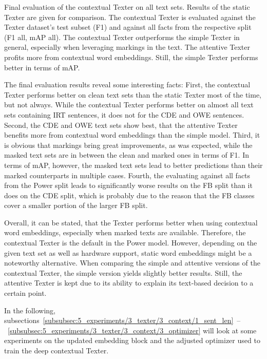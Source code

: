 \begin{table}
    \centering
    
    \caption{Final evaluation of the contextual Texter on all text sets. Results of the static Texter are given for comparison. The contextual Texter is evaluated against the Texter dataset's test subset (F1) and against all facts from the respective split (F1 all, mAP all). The contextual Texter outperforms the simple Texter in general, especially when leveraging markings in the text. The attentive Texter profits more from contextual word embeddings. Still, the simple Texter performs better in terms of mAP.}
    \label{tab:5_experiments/3_texter/3_context/results}
\end{table}

The final evaluation results reveal some interesting facts: First, the contextual Texter performs better on clean text sets than the static Texter most of the time, but not always. While the contextual Texter performs better on almost all text sets containing IRT sentences, it does not for the CDE and OWE sentences. Second, the CDE and OWE text sets show best, that the attentive Texter benefits more from contextual word embeddings than the simple model. Third, it is obvious that markings bring great improvements, as was expected, while the masked text sets are in between the clean and marked ones in terms of F1. In terms of mAP, however, the masked text sets lead to better predictions than their marked counterparts in multiple cases. Fourth, the evaluating against all facts from the Power split leads to significantly worse results on the FB split than it does on the CDE split, which is probably due to the reason that the FB classes cover a smaller portion of the larger FB split.

Overall, it can be stated, that the Texter performs better when using contextual word embeddings, especially when marked texts are available. Therefore, the contextual Texter is the default in the Power model. However, depending on the given text set as well as hardware support, static word embeddings might be a noteworthy alternative. When comparing the simple and attentive versions of the contextual Texter, the simple version yields slightly better results. Still, the attentive Texter is kept due to its ability to explain its text-based decision to a certain point.

In the following, subsections~\ref{subsubsec:5_experiments/3_texter/3_context/1_sent_len}~--~\ref{subsubsec:5_experiments/3_texter/3_context/3_optimizer} will look at some experiments on the updated embedding block and the adjusted optimizer used to train the deep contextual Texter.


